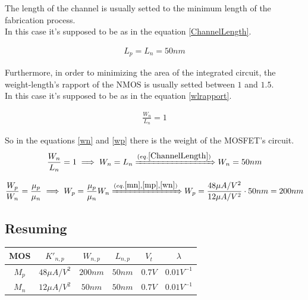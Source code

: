 The length of the channel is usually setted to the minimum length of the fabrication process.\\
In this case it's supposed to be as in the equation \ref{ChannelLength}.\par
\begin{align}
L_p = L_n = 50 nm \label{ChannelLength}
\end{align}

Furthermore, in order to minimizing the area of the integrated circuit, the weight-length's rapport of the NMOS is usually setted between $1$ and $1.5$.\\
In this case it's supposed to be as in the equation \ref{wlrapport}. \par
\begin{align}
\frac{W_n}{L_n} = 1 \label{wlrapport}
\end{align}

So in the equations \ref{wn} and \ref{wp} there is the weight of the MOSFET's circuit.\\

\begin{align}
\frac{W_n}{L_n} = 1 \implies W_n = L_n \xRightarrow{(eq. \ref{ChannelLength})} W_n = 50nm \label{wn}
\end{align} 

\begin{align}
\frac{W_p}{W_n} = \frac{\mu _p}{\mu _n} \implies W_p = \frac{\mu _p}{\mu _n}W_n \xRightarrow{(eq. \ref{mn}, \ref{mp}, \ref{wn})} W_p = \frac{48 \mu A / V^2}{12 \mu A / V^2} \cdot 50nm = 200nm
\end{align}

\subsection{Resuming}
\begin{center}
\begin{tabular}{|c|c|c|c|c|c|}
\hline
MOS & $K'_{n,p}$ & $W_{n,p}$ & $L_{n,p}$ & $V_t$ & $\lambda$\\
\hline
$M_p$ & $48 \mu A / V^2$ & $200nm$ & $50nm$ & $0.7V$ & $0.01 V^{-1}$\\
$M_n$ & $12 \mu A / V^2$ & $50nm$ & $50nm$ & $0.7V$ & $0.01 V^{-1}$\\
\hline
\end{tabular}
\end{center}